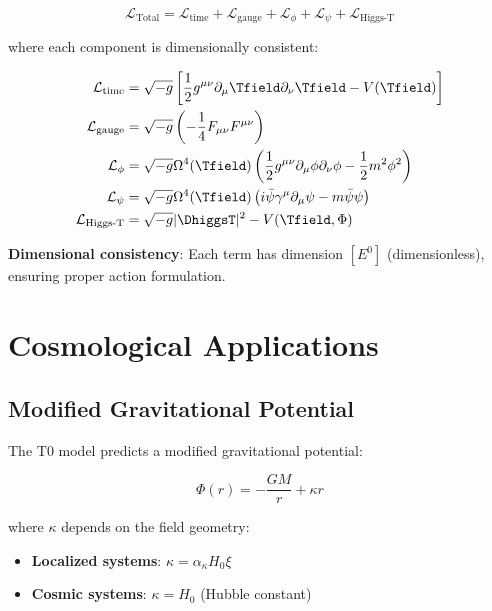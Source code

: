 	\begin{equation}
		\mathcal{L}_{\text{Total}} = \mathcal{L}_{\text{time}} + \mathcal{L}_{\text{gauge}} + \mathcal{L}_{\phi} + \mathcal{L}_{\psi} + \mathcal{L}_{\text{Higgs-T}}
		\label{eq:total_lagrangian}
	\end{equation}
	
	where each component is dimensionally consistent:
	
	\begin{align}
		\mathcal{L}_{\text{time}} &= \sqrt{-g} \left[\frac{1}{2} g^{\mu\nu} \partial_\mu \Tfield \partial_\nu \Tfield - V(\Tfield)\right] \\
		\mathcal{L}_{\text{gauge}} &= \sqrt{-g} \left(-\frac{1}{4} F_{\mu\nu} F^{\mu\nu}\right) \\
		\mathcal{L}_{\phi} &= \sqrt{-g} \Omega^4(\Tfield) \left(\frac{1}{2} g^{\mu\nu} \partial_\mu \phi \partial_\nu \phi - \frac{1}{2} m^2 \phi^2\right) \\
		\mathcal{L}_{\psi} &= \sqrt{-g} \Omega^4(\Tfield) \left(i\bar{\psi}\gamma^\mu\partial_\mu\psi - m\bar{\psi}\psi\right) \\
		\mathcal{L}_{\text{Higgs-T}} &= \sqrt{-g} |\DhiggsT|^2 - V(\Tfield, \Phi)
	\end{align}
	
	\textbf{Dimensional consistency}: Each term has dimension $[E^0]$ (dimensionless), ensuring proper action formulation.
	
	\section{Cosmological Applications}
	\label{sec:cosmological_applications}
	
	\subsection{Modified Gravitational Potential}
	\label{subsec:modified_potential}
	
	The T0 model predicts a modified gravitational potential:
	
	\begin{equation}
		\Phi(r) = -\frac{GM}{r} + \kappa r
		\label{eq:modified_gravitational_potential}
	\end{equation}
	
	where $\kappa$ depends on the field geometry:
	\begin{itemize}
		\item \textbf{Localized systems}: $\kappa = \alpha_\kappa H_0 \xi$
		\item \textbf{Cosmic systems}: $\kappa = H_0$ (Hubble constant)
	\end{itemize}
	
